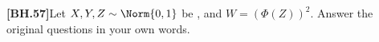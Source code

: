 \begin{exercise}
	\textbf{[BH.57]}Let $X, Y, Z \sim \Norm{0,1}$ be \iid, and $W=(\Phi(Z))^2$. Answer the original questions in your own words.
\end{exercise}